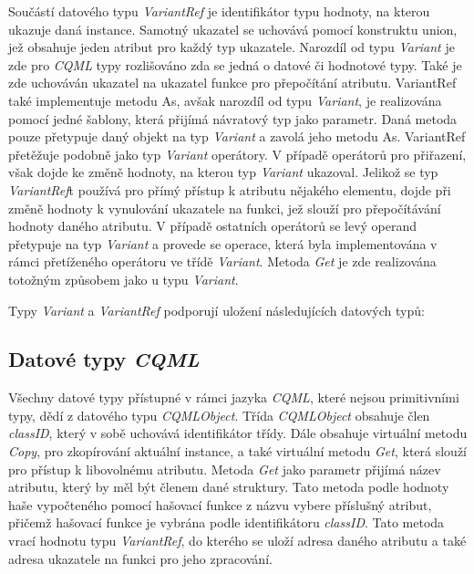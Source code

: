 \documentclass[11pt,twoside,a4paper]{book}
\begin{document}
{{\begin{ttemize}
{{\begin{lastlisting}[frame=single,caption=Řešení v pseudokódu problematického použití operátoru "." v přiřazovacím výroku,label=lst:var0N]
Součástí datového typu \textit{VariantRef} je identifikátor typu hodnoty, na kterou ukazuje daná instance. Samotný ukazatel se uchovává pomocí konstruktu union, jež obsahuje jeden atribut pro každý typ ukazatele. Narozdíl od typu \textit{Variant} je zde pro \textit{CQML} typy rozlišováno zda se jedná o datové či hodnotové typy. Také je zde uchováván ukazatel na ukazatel funkce pro přepočítání atributu.
VariantRef také implementuje metodu As, avšak narozdíl od typu \textit{Variant}, je realizována pomocí jedné šablony, která přijímá návratový typ jako parametr. Daná metoda pouze přetypuje daný objekt na typ \textit{Variant} a zavolá jeho metodu As.
VariantRef přetěžuje podobně jako typ \textit{Variant} operátory. V případě operátorů pro přiřazení, však dojde ke změně hodnoty, na kterou typ \textit{Variant} ukazoval. Jelikož se typ \textit{VariantRef}t používá pro přímý přístup k atributu nějakého elementu, dojde při změně hodnoty k vynulování ukazatele na funkci, jež slouží pro přepočítávání hodnoty daného atributu. V případě ostatních operátorů se levý operand přetypuje na typ \textit{Variant} a provede se operace, která byla implementována v rámci přetíženého operátoru ve třídě \textit{Variant}. Metoda \textit{Get} je zde realizována totožným způsobem jako u typu \textit{Variant}.

Typy \textit{Variant} a \textit{VariantRef} podporují uložení následujících datových typů:
\begin{itemize}
\item číselné typy - \textit{int}, \textit{long}, \textit{long long} (\textit{signed} i \textit{unsigned}), \textit{float, \textit{double}, \textit{long double}
\item řetězec - \textit{string}, \textit{char*}
\item libovolný datový \textit{CQML} typ - \textit{CQMLObject*}
\item obecný ukazatel - \textit{void*}
\end{itemize}

\subsection{Datové typy \textit{CQML}}
Všechny datové typy přístupné v rámci jazyka \textit{CQML}, které nejsou primitivními typy, dědí z datového typu \textit{CQMLObject}. Třída \textit{CQMLObject} obsahuje člen \textit{classID}, který v sobě uchovává identifikátor třídy. Dále obsahuje virtuální metodu \textit{Copy}, pro zkopírování aktuální instance, a také virtuální metodu \textit{Get}, která slouží pro přístup k libovolnému atributu. Metoda \textit{Get} jako parametr přijímá název atributu, který by měl být členem dané struktury. Tato metoda podle hodnoty haše vypočteného pomocí hašovací funkce z názvu vybere příslušný atribut, přičemž hašovací funkce je vybrána podle identifikátoru \textit{classID}. Tato metoda vrací hodnotu typu \textit{VariantRef}, do kterého se uloží adresa daného atributu a také adresa ukazatele na funkci pro jeho zpracování.\\


\end{lastlisting}}}
\end{ttemize}}}
\end{document}
